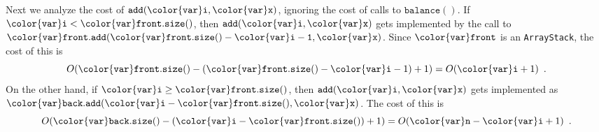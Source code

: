 \documentclass[10pt]{book}
\newcommand{\eqlabel}[1]{\label{eq:#1}}
\theoremstyle{plain}
\theoremstyle{definition}
\begin{document}
Next we analyze the cost of \ensuremath{\mathtt{add({\color{var}i},{\color{var}x})}}, ignoring the cost of calls to
\ensuremath{\mathtt{balance()}}. If $\ensuremath{\mathtt{{\color{var}i}}}<\ensuremath{\mathtt{{\color{var}front}.size()}}$, then \ensuremath{\mathtt{add({\color{var}i},{\color{var}x})}} gets implemented
by the call to $\ensuremath{\mathtt{{\color{var}front}.add({\color{var}front}.size()-{\color{var}i}-1,{\color{var}x})}}$.  Since \ensuremath{\mathtt{{\color{var}front}}} is an
\texttt{ArrayStack}, the cost of this is
\begin{equation}
  O(\ensuremath{\mathtt{{\color{var}front}.size()}}-(\ensuremath{\mathtt{{\color{var}front}.size()}}-\ensuremath{\mathtt{{\color{var}i}}}-1)+1) = O(\ensuremath{\mathtt{{\color{var}i}}}+1) \enspace .
  \eqlabel{das-front}
\end{equation}
On the other hand, if $\ensuremath{\mathtt{{\color{var}i}}}\ge\ensuremath{\mathtt{{\color{var}front}.size()}}$, then \ensuremath{\mathtt{add({\color{var}i},{\color{var}x})}} gets
implemented as $\ensuremath{\mathtt{{\color{var}back}.add({\color{var}i}-{\color{var}front}.size(),{\color{var}x})}}$.  The cost of this is
\begin{equation}
  O(\ensuremath{\mathtt{{\color{var}back}.size()}}-(\ensuremath{\mathtt{{\color{var}i}}}-\ensuremath{\mathtt{{\color{var}front}.size()}})+1) = O(\ensuremath{\mathtt{{\color{var}n}}}-\ensuremath{\mathtt{{\color{var}i}}}+1) \enspace .
  \eqlabel{das-back}
\end{equation}
\end{document}

